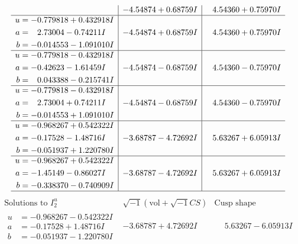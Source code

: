 \documentclass[1p]{elsarticle_modified}
\theoremstyle{definition}
\newcommand{\I}{\sqrt{-1}}
\begin{document}
$$\begin{array}{c|c|c}
 & -4.54874 + 0.68759 I & \phantom{-}4.54360 + 0.75970 I \\ \hline\begin{aligned}
u &= -0.779818 + 0.432918 I \\
a &= \phantom{-}2.73004 - 0.74211 I \\
b &= -0.014553 - 1.091010 I\end{aligned}
 & -4.54874 + 0.68759 I & \phantom{-}4.54360 + 0.75970 I \\ \hline\begin{aligned}
u &= -0.779818 - 0.432918 I \\
a &= -0.42623 - 1.61459 I \\
b &= \phantom{-}0.043388 - 0.215741 I\end{aligned}
 & -4.54874 - 0.68759 I & \phantom{-}4.54360 - 0.75970 I \\ \hline\begin{aligned}
u &= -0.779818 - 0.432918 I \\
a &= \phantom{-}2.73004 + 0.74211 I \\
b &= -0.014553 + 1.091010 I\end{aligned}
 & -4.54874 - 0.68759 I & \phantom{-}4.54360 - 0.75970 I \\ \hline\begin{aligned}
u &= -0.968267 + 0.542322 I \\
a &= -0.17528 - 1.48716 I \\
b &= -0.051937 + 1.220780 I\end{aligned}
 & -3.68787 - 4.72692 I & \phantom{-}5.63267 + 6.05913 I \\ \hline\begin{aligned}
u &= -0.968267 + 0.542322 I \\
a &= -1.45149 - 0.86027 I \\
b &= -0.338370 - 0.740909 I\end{aligned}
 & -3.68787 - 4.72692 I & \phantom{-}5.63267 + 6.05913 I\\
 \hline 
 \end{array}$$\newpage$$\begin{array}{c|c|c}  
\text{Solutions to }I^u_{2}& \I (\text{vol} + \sqrt{-1}CS) & \text{Cusp shape}\\
 \hline 
\begin{aligned}
u &= -0.968267 - 0.542322 I \\
a &= -0.17528 + 1.48716 I \\
b &= -0.051937 - 1.220780 I\end{aligned}
 & -3.68787 + 4.72692 I & \phantom{-}5.63267 - 6.05913 I \\ \hline\begin{aligned}

\end{aligned}
\end{array}$$
\end{document}
